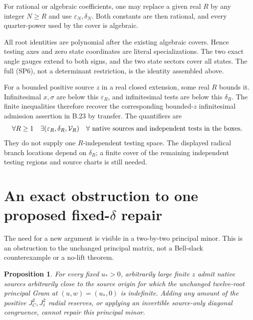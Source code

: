 \documentclass[10pt]{article}
\newtheorem{proposition}[theorem]{Proposition}
\newcommand{\eps}{\varepsilon}
\begin{document}
For rational or algebraic coefficients, one may replace a given real
$R$ by any integer $N\ge R$ and use $\eps_N,\delta_N$. Both constants
are then rational, and every quarter-power used by the cover is algebraic.

All root identities are polynomial after the existing algebraic
covers. Hence testing axes and zero state coordinates are literal
specializations. The two exact angle gauges extend to both signs,
and the two state sectors cover all states. The full (SP6), not a
determinant restriction, is the identity assembled above.

For a bounded positive source $z$ in a real closed extension, some
real $R$ bounds it. Infinitesimal $x,\sigma$ are below this
$\eps_R$, and infinitesimal tests are below this $\delta_R$.
The finite inequalities therefore recover the corresponding
bounded-$z$ infinitesimal admission assertion in B.23 by transfer.
The quantifiers are
\[
 \forall R\ge1\quad\exists(\eps_R,\delta_R,\mathcal V_R)\quad
             \forall\hbox{ native sources and independent tests in the boxes}.
\]
They do not supply one $R$-independent testing space. The displayed
radical branch locations depend on $\delta_R$; a finite cover of the
remaining independent testing regions and source charts is still needed.

\section{An exact obstruction to one proposed fixed-$\delta$ repair}

The need for a new argument is visible in a two-by-two principal
minor. This is an obstruction to the unchanged principal matrix,
not a Bell-slack counterexample or a no-lift theorem.

\begin{proposition}\label{prop:minor}
For every fixed $u_*>0$, arbitrarily large finite $z$ admit native
sources arbitrarily close to the source origin for which the unchanged
twelve-root principal Gram at $(u,w)=(u_*,0)$ is indefinite.
Adding any amount of the positive $J_C^2,J_\ell^2$ radial reserves,
or applying an invertible source-only diagonal congruence, cannot
repair this principal minor.
\end{proposition}
\end{document}
